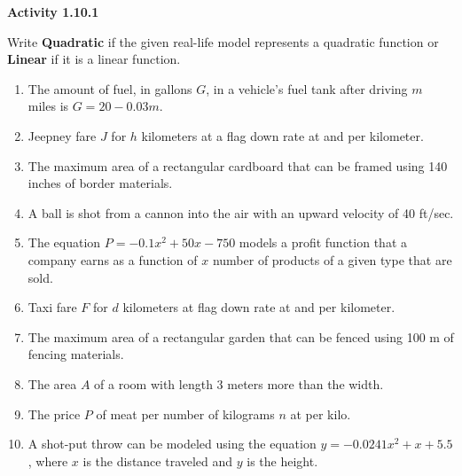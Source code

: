 \vspace{1ex}
\noindent\textbf{Activity 1.10.1}

\vspace{0.75ex}

Write \textbf{Quadratic} if the
 given real-life model represents a quadratic function or \textbf{Linear} if it is a linear function. 
 \begin{enumerate}[label = \color{blue}\arabic*. ]
 \item The amount of fuel, in gallons $G$, in a vehicle's fuel tank after driving $m$ miles is $G = 20 - 0.03m$.
 \item Jeepney fare $J$ for $h$ kilometers at a flag down rate at  and  per kilometer.
 \item The maximum area of a rectangular cardboard that can be framed using 140 inches of border materials.
 \item A ball is shot from a cannon into the air with an upward velocity of 40 ft/sec. 
 \item The equation $P = -0.1x^{2} + 50x - 750$ models a profit function that a company earns as a function of $x$ number of products of a given type that are sold.
\item Taxi fare $F$ for $d$ kilometers at flag down rate at  and  per kilometer.
\item The maximum area of a rectangular garden that can be fenced using 100 m of fencing materials. 
\item The area $A$ of a room with length 3 meters more than the width. 
\item The price $P$ of meat per number of kilograms $n$ at  per kilo.
\item A shot-put throw can be modeled using the equation $y = - 0.0241x^{2} + x + 5.5$ , where $x$ is the distance traveled and $y$ is the height.
 \end{enumerate}
 